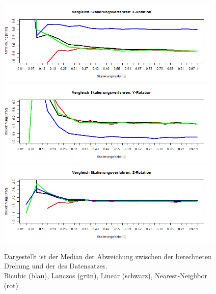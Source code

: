 \begin{figure}
	\centering
	\includegraphics[width=\linewidth]{img_Skalierung/Skal_Diff_RX}
	\includegraphics[width=\linewidth]{img_Skalierung/Skal_Diff_RY}
	\includegraphics[width=\linewidth]{img_Skalierung/Skal_Diff_RZ}
	\caption{Dargestellt ist der Median der Abweichung zwischen der berechneten Drehung und der des Datensatzes.\\
		Bicubic (blau), Lanczos (grün), Linear (schwarz), Nearest-Neighbor (rot)}
	\label{img_Rot_Dif}
\end{figure}
